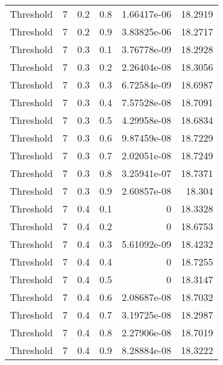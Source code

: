 \documentclass{article}
\begin{document}
\begin{longtable}[H]{lrrrrr}
 Threshold      &       7 &   0.2 &            0.8 &      1.66417e-06 &         18.2919 \\
 Threshold      &       7 &   0.2 &            0.9 &      3.83825e-06 &         18.2717 \\
 Threshold      &       7 &   0.3 &            0.1 &      3.76778e-09 &         18.2928 \\
 Threshold      &       7 &   0.3 &            0.2 &      2.26404e-08 &         18.3056 \\
 Threshold      &       7 &   0.3 &            0.3 &      6.72584e-09 &         18.6987 \\
 Threshold      &       7 &   0.3 &            0.4 &      7.57528e-08 &         18.7091 \\
 Threshold      &       7 &   0.3 &            0.5 &      4.29958e-08 &         18.6834 \\
 Threshold      &       7 &   0.3 &            0.6 &      9.87459e-08 &         18.7229 \\
 Threshold      &       7 &   0.3 &            0.7 &      2.02051e-08 &         18.7249 \\
 Threshold      &       7 &   0.3 &            0.8 &      3.25941e-07 &         18.7371 \\
 Threshold      &       7 &   0.3 &            0.9 &      2.60857e-08 &         18.304  \\
 Threshold      &       7 &   0.4 &            0.1 &      0           &         18.3328 \\
 Threshold      &       7 &   0.4 &            0.2 &      0           &         18.6753 \\
 Threshold      &       7 &   0.4 &            0.3 &      5.61092e-09 &         18.4232 \\
 Threshold      &       7 &   0.4 &            0.4 &      0           &         18.7255 \\
 Threshold      &       7 &   0.4 &            0.5 &      0           &         18.3147 \\
 Threshold      &       7 &   0.4 &            0.6 &      2.08687e-08 &         18.7032 \\
 Threshold      &       7 &   0.4 &            0.7 &      3.19725e-08 &         18.2987 \\
 Threshold      &       7 &   0.4 &            0.8 &      2.27906e-08 &         18.7019 \\
 Threshold      &       7 &   0.4 &            0.9 &      8.28884e-08 &         18.3222 \\

\end{longtable}
\end{document}
